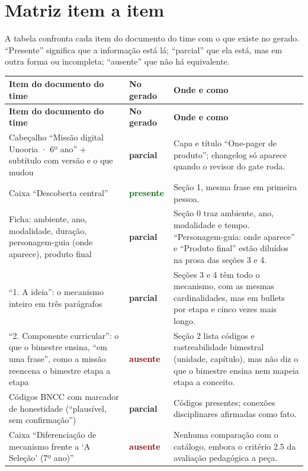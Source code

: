 \documentclass[11pt,a4paper]{article}
\newcommand{\presente}{\textcolor{DarkGreen}{\textbf{presente}}}
\newcommand{\parcial}{\textcolor{DarkYellow}{\textbf{parcial}}}
\newcommand{\ausente}{\textcolor{DarkRed}{\textbf{ausente}}}
\begin{document}
\section{Matriz item a item}

A tabela confronta cada item do documento do time com o que existe no gerado. ``Presente'' significa que a informação está lá; ``parcial'' que ela está, mas em outra forma ou incompleta; ``ausente'' que não há equivalente.

\begin{small}
\begin{longtable}{@{}p{} p{} p{}@{}}
\toprule
\textbf{Item do documento do time} & \textbf{No gerado} & \textbf{Onde e como} \\
\midrule
\endfirsthead
\toprule
\textbf{Item do documento do time} & \textbf{No gerado} & \textbf{Onde e como} \\
\midrule
\endhead
Cabeçalho ``Missão digital Unooria · 6º ano'' + subtítulo com versão e o que mudou & \parcial & Capa e título ``One-pager de produto''; changelog só aparece quando o revisor do gate roda. \\
Caixa ``Descoberta central'' & \presente & Seção 1, mesma frase em primeira pessoa. \\
Ficha: ambiente, ano, modalidade, duração, personagem-guia (onde aparece), produto final & \parcial & Seção 0 traz ambiente, ano, modalidade e tempo. ``Personagem-guia: onde aparece'' e ``Produto final'' estão diluídos na prosa das seções 3 e 4. \\
``1. A ideia'': o mecanismo inteiro em três parágrafos & \parcial & Seções 3 e 4 têm todo o mecanismo, com as mesmas cardinalidades, mas em bullets por etapa e cinco vezes mais longo. \\
``2. Componente curricular'': o que o bimestre ensina, ``em uma frase'', como a missão reencena o bimestre etapa a etapa & \ausente & Seção 2 lista códigos e rastreabilidade bimestral (unidade, capítulo), mas não diz o que o bimestre ensina nem mapeia etapa a conceito. \\
Códigos BNCC com marcador de honestidade (``plausível, sem confirmação'') & \parcial & Códigos presentes; conexões disciplinares afirmadas como fato. \\
Caixa ``Diferenciação de mecanismo frente a `A Seleção' (7º ano)'' & \ausente & Nenhuma comparação com o catálogo, embora o critério 2.5 da avaliação pedagógica a peça. \\

\end{longtable}
\end{small}
\end{document}

